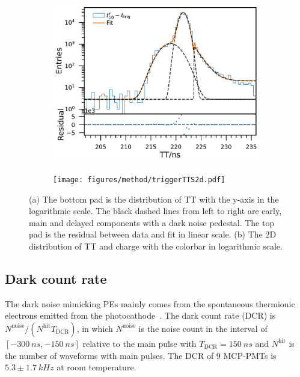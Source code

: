 \begin{figure}[!htbp]
    \centering
    \begin{subfigure}[t]{\SF\textwidth}
        \includegraphics[width=\textwidth]{figures/method/triggerTTSLog.pdf}
        \caption{}%
        \label{fig:triggerTTSLog}
    \end{subfigure}
    \begin{subfigure}[t]{\SF\textwidth}
        \texttt{[image: figures/method/triggerTTS2d.pdf]}
        \caption{}%
        \label{fig:triggerTTS2d}
    \end{subfigure}
    \caption{(a) The bottom pad is the distribution of TT with the y-axis in the logarithmic scale. The black dashed lines from left to right are early, main and delayed components with a dark noise pedestal. The top pad is the residual between data and fit in linear scale. (b) The 2D distribution of TT and charge with the colorbar in logarithmic scale.}
\end{figure}

\subsection{Dark count rate}
\label{sec:dcr}
The dark noise mimicking PEs mainly comes from the spontaneous thermionic electrons emitted from the photocathode~\cite{KM3NetTesting}. The dark count rate (DCR) is ${N^{\mathrm{noise}}}/({N^{\mathrm{hit}}T_{\mathrm{DCR}}})$, in which $N^{\mathrm{noise}}$ is the noise count in the interval of $[\SI{-300}{ns},\SI{-150}{ns}]$ relative to the main pulse with $T_{\mathrm{DCR}}=\SI{150}{ns}$ and $N^{\mathrm{hit}}$ is the number of waveforms with main pulses. The DCR of 9 MCP-PMTs is $5.3\pm\SI{1.7}{kHz}$ at room temperature.


